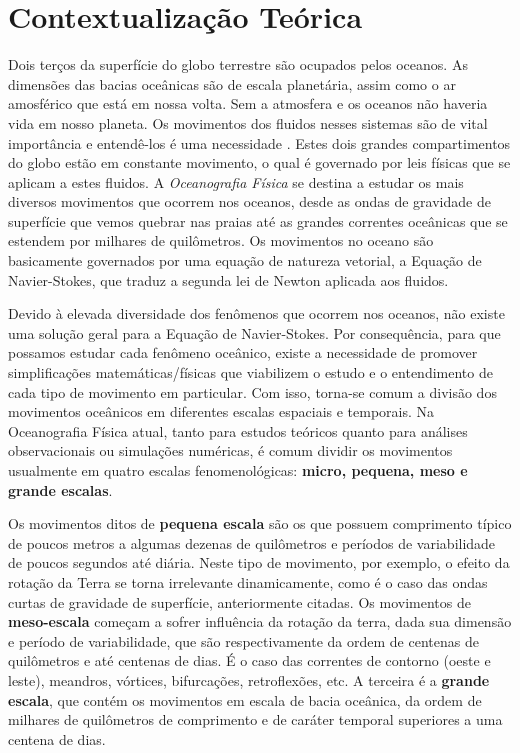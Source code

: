 \section{Contextualização Teórica}\label{sec:intteo}

\hspace{6mm} Dois terços da superfície do globo terrestre são ocupados pelos oceanos. 
As dimensões das bacias oceânicas são de escala planetária, 
assim como o ar amosférico que está em nossa volta. Sem a atmosfera e os oceanos não haveria
vida em nosso planeta. Os movimentos dos fluidos nesses sistemas são de vital importância e entendê-los
é uma necessidade \citep{cushman1994}. Estes dois grandes compartimentos 
do globo estão em constante movimento, o qual é governado por leis 
físicas que se aplicam a estes fluidos. A {\it Oceanografia 
Física} se destina a estudar os mais
diversos movimentos que ocorrem nos oceanos, desde as ondas de gravidade de superfície que vemos quebrar nas praias até 
as grandes correntes oceânicas que se estendem por milhares de quilômetros. Os movimentos no oceano
são basicamente governados por uma equação de natureza vetorial, a Equação de Navier-Stokes, que traduz a
segunda lei de Newton aplicada aos fluidos.

Devido à elevada diversidade dos
fenômenos que ocorrem nos oceanos, não existe uma solução geral para a Equação de Navier-Stokes.
 Por consequência, para que possamos estudar cada fenômeno oceânico, existe a necessidade de promover
sim\-pli\-fi\-ca\-ções matemáticas/físicas que viabilizem o estudo e o entendimento de cada tipo de movimento em particular. 
Com isso, torna-se comum a divisão dos movimentos oceânicos em diferentes escalas
espaciais e temporais. Na Oceanografia Física atual, tanto para estudos teóricos quanto 
para análises observacionais ou simulações numéricas, é comum dividir os movimentos 
usualmente em quatro escalas fe\-no\-me\-no\-ló\-gi\-cas: {\bf micro, pequena, meso e grande escalas}. 

Os movimentos ditos de {\bf pequena escala} são os que possuem comprimento típico de poucos
metros a algumas dezenas de quilômetros e períodos de variabilidade de poucos segundos
até diária. Neste tipo de movimento, por exemplo, o efeito da rotação da Terra
se torna irrelevante dinamicamente, como é o caso das ondas curtas de gravidade de superfície, anteriormente citadas. 
Os movimentos de {\bf meso-escala} começam a sofrer influência da rotação da terra, dada
sua dimensão e período de variabilidade, que são respectivamente da ordem de centenas
de quilômetros e até centenas de dias. É o caso das correntes de contorno (oeste e leste), meandros, 
vórtices, bifurcações, retroflexões, etc. A terceira é a {\bf grande escala}, que 
contém os movimentos em escala de bacia oceânica, da ordem de milhares de quilômetros de 
comprimento e de caráter temporal superiores a uma centena de dias. 

